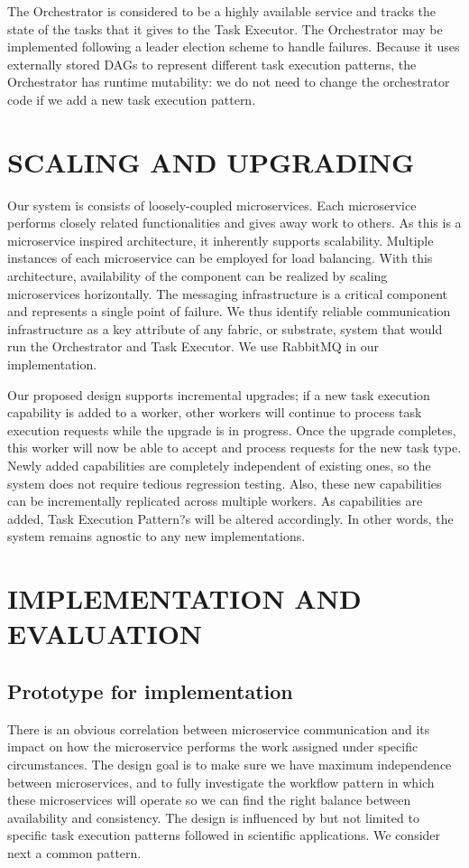 \documentclass[review]{elsarticle}
\begin{document}
The Orchestrator is considered to be a highly available service and tracks the state of the tasks that it gives to the Task Executor.  The Orchestrator may be implemented following a leader election scheme to handle failures.  Because it uses externally stored DAGs to represent different task execution patterns, the Orchestrator has runtime mutability: we do not need to change the orchestrator code if we add a new task execution pattern. 

\section{SCALING AND UPGRADING}

Our system is consists of loosely-coupled microservices. Each microservice performs closely related functionalities and gives away work to others. As this is a microservice inspired architecture, it inherently supports scalability. Multiple instances of each microservice can be employed for load balancing. With this architecture, availability of the component can be realized by scaling microservices horizontally. The messaging infrastructure is a critical component and represents a single point of failure. We thus identify reliable communication infrastructure as a key attribute of any fabric, or substrate, system that would run the Orchestrator and Task Executor. We use RabbitMQ in our implementation. 

Our proposed design supports incremental upgrades; if a new task execution capability is added to a worker, other workers will continue to process task execution requests while the upgrade is in progress. Once the upgrade completes, this worker will now be able to accept and process requests for the new task type. Newly added capabilities are completely independent of existing ones, so the system does not require tedious regression testing. Also, these new capabilities can be incrementally replicated across multiple workers. As capabilities are added, Task Execution Pattern?s will be altered accordingly.  In other words, the system remains agnostic to any new implementations.

\section{IMPLEMENTATION AND EVALUATION}

\subsection{Prototype for implementation}
There is an obvious correlation between microservice communication and its impact on how the microservice performs the work assigned under specific circumstances. The design goal is to make sure we have maximum independence between microservices, and to fully investigate the workflow pattern in which these microservices will operate so we can find the right balance between availability and consistency.
The design is influenced by but not limited to specific task execution patterns followed in scientific applications.   We consider next a common pattern. 
\end{document}
